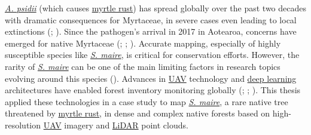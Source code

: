 \documentclass[
]{scrreprt}
\begin{document}
\hyperref[acronyms_AP]{\emph{A. psidii}} (which causes
\hyperref[acronyms_MR]{myrtle rust}) has spread globally over the past
two decades with dramatic consequences for Myrtaceae, in severe cases
even leading to local extinctions
(;
). Since the pathogen's arrival in 2017 in Aotearoa,
concerns have emerged for native Myrtaceae
(;
; ). Accurate mapping, especially of highly susceptible species like
\hyperref[acronyms_SM]{\emph{S. maire}}, is critical for conservation
efforts. However, the rarity of \hyperref[acronyms_SM]{\emph{S. maire}}
can be one of the main limiting factors in research topics evolving
around this species
(). Advances in \hyperref[acronyms_UAV]{UAV} technology and
\hyperref[acronyms_DL]{deep learning} architectures have enabled forest
inventory monitoring globally
(; ;
). This
thesis applied these technologies in a case study to map
\hyperref[acronyms_SM]{\emph{S. maire}}, a rare native tree threatened
by \hyperref[acronyms_MR]{myrtle rust}, in dense and complex native
forests based on high-resolution \hyperref[acronyms_UAV]{UAV} imagery
and \hyperref[acronyms_LiDAR]{LiDAR} point clouds.
\end{document}
